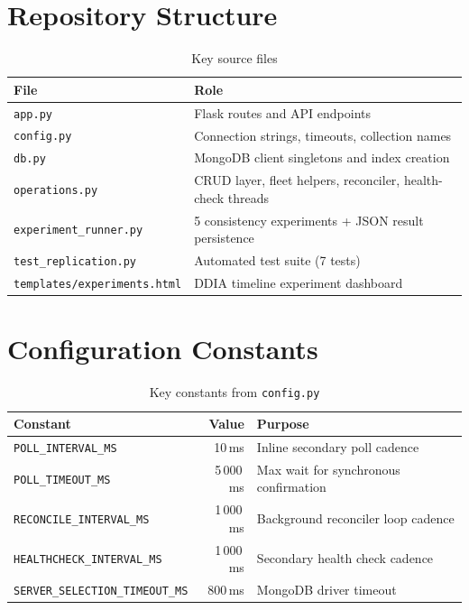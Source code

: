 \documentclass[12pt,a4paper]{article}
\newcommand{\code}[1]{\texttt{\small #1}}
\begin{document}
\appendix
\section{Repository Structure}

\begin{table}[H]
  \centering
  \caption{Key source files}
  \small
  \begin{tabularx}{\textwidth}{lX}
    \toprule
    File & Role \\
    \midrule
    \code{app.py}               & Flask routes and API endpoints \\
    \code{config.py}            & Connection strings, timeouts, collection names \\
    \code{db.py}                & MongoDB client singletons and index creation \\
    \code{operations.py}        & CRUD layer, fleet helpers, reconciler, health-check threads \\
    \code{experiment\_runner.py}& 5 consistency experiments + JSON result persistence \\
    \code{test\_replication.py} & Automated test suite (7 tests) \\
    \code{templates/experiments.html} & DDIA timeline experiment dashboard \\
    \bottomrule
  \end{tabularx}
\end{table}

\section{Configuration Constants}

\begin{table}[H]
  \centering
  \caption{Key constants from \texttt{config.py}}
  \begin{tabularx}{\textwidth}{lrX}
    \toprule
    Constant & Value & Purpose \\
    \midrule
    \code{POLL\_INTERVAL\_MS}        & 10\,ms     & Inline secondary poll cadence \\
    \code{POLL\_TIMEOUT\_MS}         & 5\,000\,ms & Max wait for synchronous confirmation \\
    \code{RECONCILE\_INTERVAL\_MS}   & 1\,000\,ms & Background reconciler loop cadence \\
    \code{HEALTHCHECK\_INTERVAL\_MS} & 1\,000\,ms & Secondary health check cadence \\
    \code{SERVER\_SELECTION\_TIMEOUT\_MS} & 800\,ms & MongoDB driver timeout \\
    \bottomrule
  \end{tabularx}
\end{table}
\end{document}
